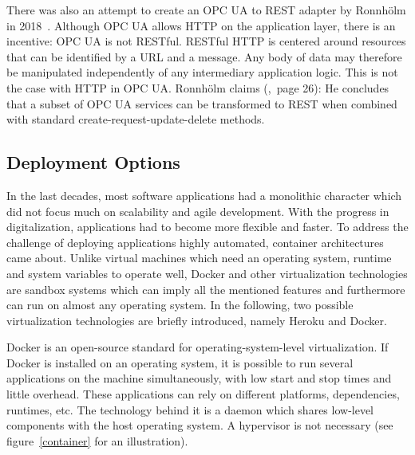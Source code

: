 There was also an attempt to create an OPC UA to REST adapter by Ronnhölm in 2018~\cite{Ronnholm2018IntegrationThesis}. Although OPC UA allows HTTP on the application layer, there is an incentive: OPC UA is not RESTful. RESTful HTTP is centered around resources that can be identified by a URL and a message. Any body of data may therefore be manipulated independently of any intermediary application logic. This is not the case with HTTP in OPC UA. Ronnhölm claims (\cite{Ronnholm2018IntegrationThesis},~page 26):  He concludes that a subset of OPC UA services can be transformed to REST when combined with standard create-request-update-delete methods.

\subsection {Deployment Options}
\label{deploymentoptions}
In the last decades, most software applications had a monolithic character which did not focus much on scalability and agile development. With the progress in digitalization, applications had to become more flexible and faster. To address the challenge of deploying applications highly automated, container architectures came about. Unlike virtual machines which need an operating system, runtime and system variables to operate well, Docker and other virtualization technologies are sandbox systems which can imply all the mentioned features and furthermore can run on almost any operating system. In the following, two possible virtualization technologies are briefly introduced, namely Heroku and Docker.~\cite{Wurbs2017Docker2018.}

Docker is an open-source standard for operating-system-level virtualization. If Docker is installed on an operating system, it is possible to run several applications on the machine simultaneously, with low start and stop times and little overhead. These applications can rely on different platforms, dependencies, runtimes, etc. The technology behind it is a daemon which shares low-level components with the host operating system. A hypervisor is not necessary (see figure~\ref{container} for an illustration). 

